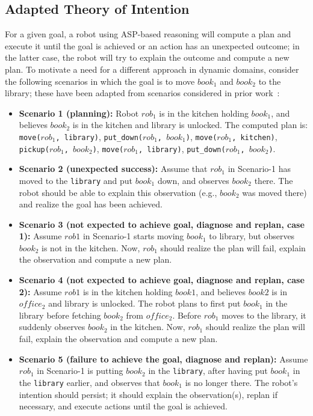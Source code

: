 \documentclass[letterpaper, 10 pt, conference]{ieeeconf}  %
\newcommand{\stt}[1]{{\small\texttt{#1}}}
\begin{document}
\subsection{Adapted Theory of Intention}
\label{sec:arch-toi}
For a given goal, a robot using ASP-based reasoning will compute a
plan and execute it until the goal is achieved or an action has an
unexpected outcome; in the latter case, the robot will try to explain
the outcome and compute a new plan. To motivate a need for a different
approach in dynamic domains, consider the following scenarios in which
the goal is to move $book_1$ and $book_2$ to the library; these have
been adapted from scenarios considered in prior
work~\cite{blount2015theory}:
\begin{itemize}
\item \textbf{Scenario 1 (planning):} Robot $rob_1$ is in the kitchen
  holding $book_1$, and believes $book_2$ is in the kitchen and
  library is unlocked. The computed plan is: \stt{move($rob_1$,
    library)}, \stt{put\_down($rob_1$, $book_1$)}, \stt{move($rob_1$,
    kitchen)}, \stt{pickup($rob_1$, $book_2$)}, \stt{move($rob_1$,
    library)}, \stt{put\_down($rob_1$, $book_2$)}.

\item \textbf{Scenario 2 (unexpected success):} Assume that $rob_1$ in
  Scenario-1 has moved to the \stt{library} and put $book_1$ down, and
  observes $book_2$ there. The robot should be able to explain this
  observation (e.g., $book_2$ was moved there) and realize the goal
  has been achieved.

\item \textbf{Scenario 3 (not expected to achieve goal, diagnose and
    replan, case 1):} Assume $rob1$ in Scenario-1 starts moving
  $book_1$ to library, but observes $book_2$ is not in the kitchen.
  Now, $rob_1$ should realize the plan will fail, explain the
  observation and compute a new plan.

\item \textbf{Scenario 4 (not expected to achieve goal, diagnose and
    replan, case 2):} Assume $rob1$ is in the kitchen holding $book1$,
  and believes $book2$ is in $office_2$ and library is unlocked. The
  robot plans to first put $book_1$ in the library before fetching
  $book_2$ from $office_2$. Before $rob_1$ moves to the library, it
  suddenly observes $book_2$ in the kitchen.  Now, $rob_1$ should
  realize the plan will fail, explain the observation and compute a
  new plan.

\item \textbf{Scenario 5 (failure to achieve the goal, diagnose and
    replan):} Assume $rob_1$ in Scenario-1 is putting $book_2$ in the
  \stt{library}, after having put $book_1$ in the \stt{library}
  earlier, and observes that $book_1$ is no longer there. The robot's
  intention should persist; it should explain the observation(s),
  replan if necessary, and execute actions until the goal is achieved.


\end{itemize}
\end{document}
